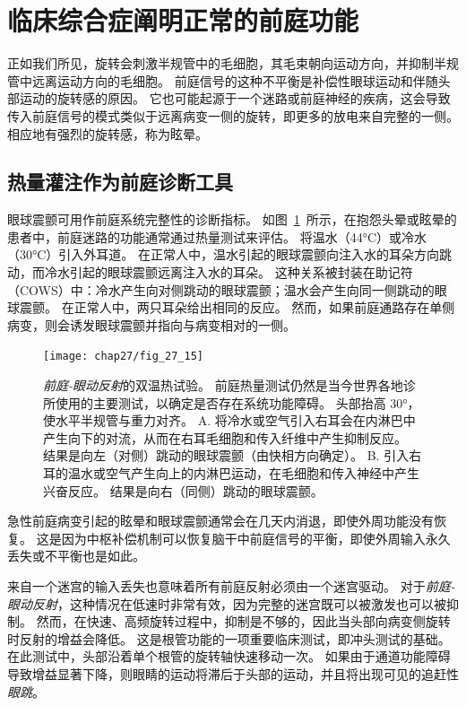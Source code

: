 \section{临床综合症阐明正常的前庭功能}

正如我们所见，旋转会刺激半规管中的毛细胞，其毛束朝向运动方向，并抑制半规管中远离运动方向的毛细胞。
前庭信号的这种不平衡是补偿性眼球运动和伴随头部运动的旋转感的原因。
它也可能起源于一个迷路或前庭神经的疾病，这会导致传入前庭信号的模式类似于远离病变一侧的旋转，即更多的放电来自完整的一侧。
相应地有强烈的旋转感，称为眩晕。



\subsection{热量灌注作为前庭诊断工具}

眼球震颤可用作前庭系统完整性的诊断指标。
如图~\ref{fig:27_15}~所示，在抱怨头晕或眩晕的患者中，前庭迷路的功能通常通过热量测试来评估。
将温水（44°C）或冷水（30°C）引入外耳道。
在正常人中，温水引起的眼球震颤向注入水的耳朵方向跳动，而冷水引起的眼球震颤远离注入水的耳朵。
这种关系被封装在助记符（COWS）中：冷水产生向对侧跳动的眼球震颤；温水会产生向同一侧跳动的眼球震颤。
在正常人中，两只耳朵给出相同的反应。
然而，如果前庭通路存在单侧病变，则会诱发眼球震颤并指向与病变相对的一侧。


\begin{figure}[htbp]
	\centering
	\texttt{[image: chap27/fig\_27\_15]}
	\caption{\textit{前庭-眼动反射}的双温热试验。
		前庭热量测试仍然是当今世界各地诊所使用的主要测试，以确定是否存在系统功能障碍。
		头部抬高 30°，使水平半规管与重力对齐。
		A. 将冷水或空气引入右耳会在内淋巴中产生向下的对流，从而在右耳毛细胞和传入纤维中产生抑制反应。
		结果是向左（对侧）跳动的眼球震颤（由快相方向确定）。
		B. 引入右耳的温水或空气产生向上的内淋巴运动，在毛细胞和传入神经中产生兴奋反应。
		结果是向右（同侧）跳动的眼球震颤。}
	\label{fig:27_15}
\end{figure}


急性前庭病变引起的眩晕和眼球震颤通常会在几天内消退，即使外周功能没有恢复。
这是因为中枢补偿机制可以恢复脑干中前庭信号的平衡，即使外周输入永久丢失或不平衡也是如此。


来自一个迷宫的输入丢失也意味着所有前庭反射必须由一个迷宫驱动。
对于\textit{前庭-眼动反射}，这种情况在低速时非常有效，因为完整的迷宫既可以被激发也可以被抑制。
然而，在快速、高频旋转过程中，抑制是不够的，因此当头部向病变侧旋转时反射的增益会降低。
这是根管功能的一项重要临床测试，即冲头测试的基础。
在此测试中，头部沿着单个根管的旋转轴快速移动一次。
如果由于通道功能障碍导致增益显著下降，则眼睛的运动将滞后于头部的运动，并且将出现可见的追赶性\textit{眼跳}。



